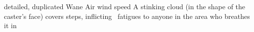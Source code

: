   {detailed, duplicated}%
  {Wane}%
  {Air}%
  {wind speed}%
  {A stinking cloud (in the shape of the caster's face) covers  \glspl{step}, inflicting ~\glspl{fatigue} to anyone in the area who breathes it in}%
  {}
